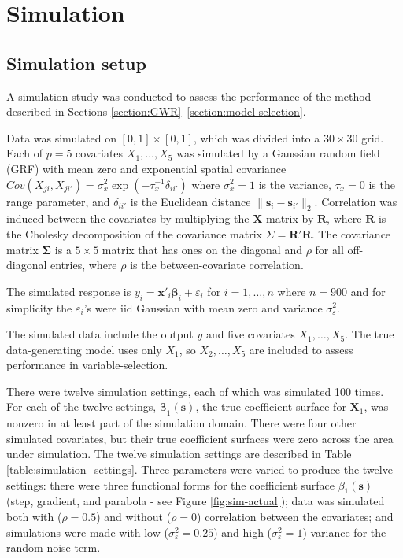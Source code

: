 \documentclass[authoryear, review, 11pt]{elsarticle}
\begin{document}
\section{Simulation \label{sec:simulation}}
	\subsection{Simulation setup}
	A simulation study was conducted to assess the performance of the method described in Sections \ref{section:GWR}--\ref{section:model-selection}. 
	
	Data was simulated on $[0,1] \times [0,1]$, which was divided into a $30 \times 30$ grid. Each of $p=5$ covariates $X_1, \dots, X_5$ was simulated by a Gaussian random field (GRF) with mean zero and exponential spatial covariance $Cov \left(X_{ji}, X_{ji'} \right) = \sigma_x^2 \exp{\left( -\tau_x^{-1} \delta_{ii'} \right)}$ where $\sigma_x^2=1$ is the variance, $\tau_x = 0$ is the range parameter, and $\delta_{ii'}$ is the Euclidean distance $\|\bm{s}_i - \bm{s}_{i'}\|_2$. Correlation was induced between the covariates by multiplying the $\bm{X}$ matrix by $\bm{R}$, where $\bm{R}$ is the Cholesky decomposition of the covariance matrix $\Sigma = \bm{R}'\bm{R}$. The covariance matrix $\bm{\Sigma}$ is a $5 \times 5$ matrix that has ones on the diagonal and $\rho$ for all off-diagonal entries, where $\rho$ is the between-covariate correlation.
		
	The simulated response is $y_i = \bm{x}'_i \bm{\beta}_i + \varepsilon_i$ for $i=1, \dots, n$ where $n=900$ and for simplicity the $\varepsilon_i$'s were iid Gaussian with mean zero and variance $\sigma_\varepsilon^2$.%
	
	The simulated data include the output $y$ and five covariates $X_1, \dots, X_5$. The true data-generating model uses only $X_1$, so $X_2, \dots, X_5$ are included to assess performance in variable-selection.
	
	There were twelve simulation settings, each of which was simulated 100 times. For each of the twelve settings, $\bm{\beta}_1(\bm{s})$, the true coefficient surface for $\bm{X}_1$, was nonzero in at least part of the simulation domain. There were four other simulated covariates, but their true coefficient surfaces were zero across the area under simulation. The twelve simulation settings are described in Table \ref{table:simulation_settings}. Three parameters were varied to produce the twelve settings: there were three functional forms for the coefficient surface $\beta_1(\bm{s})$ (step, gradient, and parabola - see Figure \ref{fig:sim-actual}); data was simulated both with ($\rho = 0.5$) and without ($\rho = 0$) correlation between the covariates; and simulations were made with low ($\sigma_\varepsilon^2 = 0.25$) and high ($\sigma_\varepsilon^2 = 1$) variance for the random noise term.\\
	
\end{document}
